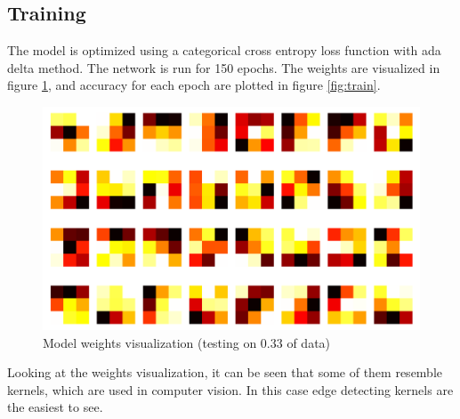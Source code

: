 \documentclass[paper=a4, fontsize=11pt]{scrartcl} %
\begin{document}
    \subsection*{Training}
    The model is optimized using a categorical cross entropy loss function with ada delta method. The network is run for 150 epochs. The weights are visualized in figure \ref{fig:weights}, and accuracy for each epoch are plotted in figure \ref{fig:train}.
    \begin{figure}[H]
        \begin{center}
            \includegraphics[width=1.0\linewidth]{images/mnist_weights.png}
            \caption{Model weights visualization (testing on 0.33 of data)}
            \label{fig:weights}
        \end{center}
    \end{figure}
    Looking at the weights visualization, it can be seen that some of them resemble kernels, which are used in computer vision. In this case edge detecting kernels are the easiest to see.
\end{document}
